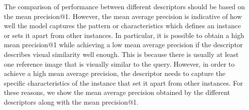 The comparison of performance between different descriptors should
be based on the mean precision@1. However, the mean average
precision is indicative of how well the model
captures the pattern or characteristics which defines an instance or
sets it apart from other instances. In particular, it is possible to obtain
a high mean precision@1 while achieving a low mean average precision
if the descriptor describes visual similarity well enough. This is because
there is usually at least one reference image that is visually similar
to the query. However, in order to achieve a high mean average precision,
the descriptor needs to capture the specific characteristics of the
instance that set it apart from other instances. For these reasons,
we show the mean average precision obtained by the different
descriptors along with the mean precision@1.
